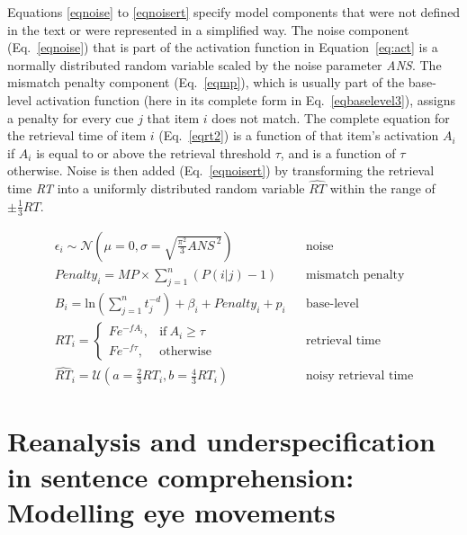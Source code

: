 \documentclass{cambridge7A}\usepackage[]{graphicx}\usepackage[]{color}
\begin{document}
\begin{subappendices}
Equations \ref{eqnoise} to \ref{eqnoisert} specify model components that were not defined in the text or were represented in a simplified way.
The noise component (Eq.~\ref{eqnoise}) that is part of the activation function in Equation~\ref{eq:act} is a normally distributed random variable scaled by the noise parameter \textit{ANS}.
The mismatch penalty component (Eq.~\ref{eqmp}), which is usually part of the base-level activation function (here in its complete form in Eq.~\ref{eqbaselevel3}), assigns a penalty for every cue $j$ that item $i$ does not match.
The complete equation for the retrieval time of item $i$ (Eq.~\ref{eqrt2}) is a function of that item's activation $A_i$ if $A_i$ is equal to or above the retrieval threshold $\tau$, and is a function of $\tau$ otherwise.
Noise is then added (Eq.~\ref{eqnoisert}) by transforming the retrieval time \textit{RT} into a uniformly distributed random variable $\widehat{\textit{RT}}$ within the range of $\pm\frac{1}{3}\textit{RT}$.

\begin{eqnarray}
  \epsilon_i \sim \mathcal{N}(\mu = 0, \sigma = \sqrt{\frac{\pi^2}{3} \textit{ANS}^{\ 2}}) && \text{noise} \label{eqnoise} \\
	\textit{Penalty}_i = \textit{MP} \times \sum_{j=1}^n (P(i|j)-1) && \text{mismatch penalty} \label{eqmp} \\
  B_i = \text{ln}(\sum_{j=1}^n t_j^{-d}) + \beta_i + \textit{Penalty}_i + p_i  && \text{base-level} \label{eqbaselevel3} \\
  \textit{RT}_i = 
		\begin{cases}
      Fe^{-fA_i}, & \text{if}\ A_i \geq \tau \\
      Fe^{-f\tau}, & \text{otherwise}
    \end{cases}  && \text{retrieval time} \label{eqrt2} \\
  \widehat{\textit{RT}}_i = \mathcal{U}(a = \frac{2}{3} \textit{RT}_i, b = \frac{4}{3} \textit{RT}_i) && \text{noisy retrieval time} \label{eqnoisert}
\end{eqnarray}

\end{subappendices}





\chapter[Reanalysis and underspecification]{Reanalysis and underspecification in sentence comprehension: Modelling eye movements} \label{c04}
\end{document}
